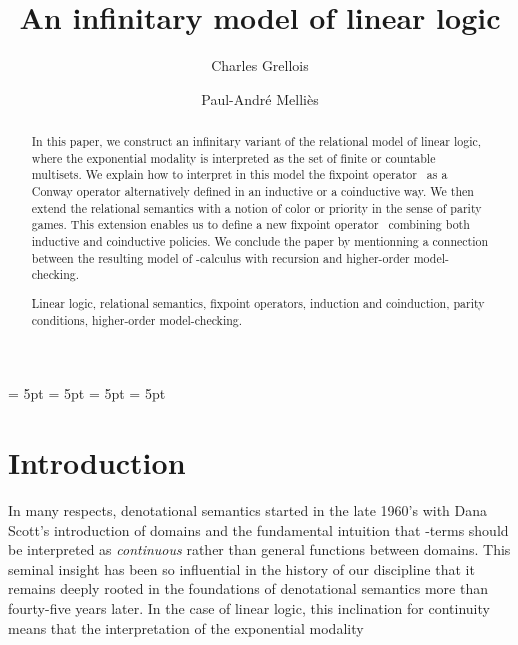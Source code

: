 \documentclass[runningheads,a4paper]{llncs}
\newcommand{\keywords}[1]{\par\addvspace\baselineskip
\noindent\keywordname\enspace\ignorespaces#1}
\begin{document}
\mainmatter  

\title{An infinitary model of linear logic}

\author{Charles Grellois \and Paul-Andr\'e Melli\`es}


\maketitle

\begin{abstract}
In this paper, we construct an infinitary variant of the relational model of linear logic, 
where the exponential modality is interpreted as the set of finite or countable multisets. 
We explain how to interpret in this model the fixpoint operator~ as a Conway operator 
alternatively defined in an inductive or a coinductive way. We then extend the relational semantics
with a notion of color or priority in the sense of parity games. This extension enables us 
to define a new fixpoint operator~ combining both inductive and coinductive policies. 
We conclude the paper by mentionning a connection between the resulting model of
-calculus with recursion and higher-order model-checking.
\keywords{Linear logic, relational semantics, fixpoint operators, induction and coinduction,
parity conditions, higher-order model-checking.}
\end{abstract}

\abovedisplayskip = 5pt
\belowdisplayskip = 5pt
\abovedisplayshortskip = 5pt
\belowdisplayshortskip = 5pt
\section{Introduction}

In many respects, denotational semantics started in the late 1960's with Dana Scott's introduction of domains and the fundamental intuition that
-terms should be interpreted as \emph{continuous} rather than general functions between domains.
This seminal insight has been so influential in the history of our discipline that it remains 
deeply rooted in the foundations of denotational semantics more than fourty-five years later.
In the case of linear logic, this inclination for continuity means that 
the interpretation of the exponential modality
\end{document}
